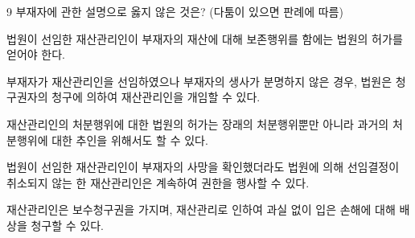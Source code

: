 \begin{question}{9}
부재자에 관한 설명으로 옳지 않은 것은? (다툼이 있으면 판례에 따름)
\begin{choices}
  \item 법원이 선임한 재산관리인이 부재자의 재산에 대해 보존행위를 함에는 법원의 허가를 얻어야 한다.
  \item 부재자가 재산관리인을 선임하였으나 부재자의 생사가 분명하지 않은 경우, 법원은 청구권자의 청구에 의하여 재산관리인을 개임할 수 있다.
  \item 재산관리인의 처분행위에 대한 법원의 허가는 장래의 처분행위뿐만 아니라 과거의 처분행위에 대한 추인을 위해서도 할 수 있다.
  \item 법원이 선임한 재산관리인이 부재자의 사망을 확인했더라도 법원에 의해 선임결정이 취소되지 않는 한 재산관리인은 계속하여 권한을 행사할 수 있다.
  \item 재산관리인은 보수청구권을 가지며, 재산관리로 인하여 과실 없이 입은 손해에 대해 배상을 청구할 수 있다.
\end{choices}
\end{question}
